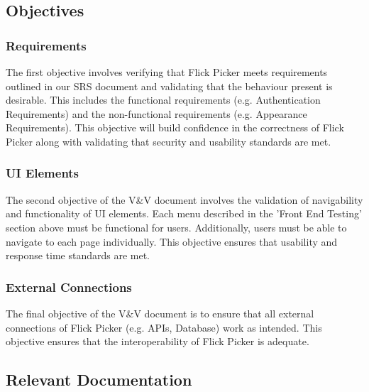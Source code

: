 \documentclass[12pt, titlepage]{article}
\begin{document}

\subsection{Objectives}
\subsubsection{Requirements}
The first objective involves verifying that Flick Picker meets requirements outlined in our SRS document and validating that the behaviour present is desirable. This includes the functional requirements (e.g. Authentication Requirements) and the non-functional requirements (e.g. Appearance Requirements). This objective will build confidence in the correctness of Flick Picker along with validating that security and usability standards are met.

\subsubsection{UI Elements}
The second objective of the V\&V document involves the validation of navigability and functionality of UI elements. Each menu described in the 'Front End Testing' section above must be functional for users. Additionally, users must be able to navigate to each page individually. This objective ensures that usability and response time standards are met. 

\subsubsection{External Connections}
The final objective of the V\&V document is to ensure that all external connections of Flick Picker (e.g. APIs, Database) work as intended. This objective ensures that the interoperability of Flick Picker is adequate. 


\subsection{Relevant Documentation}
\end{document}
